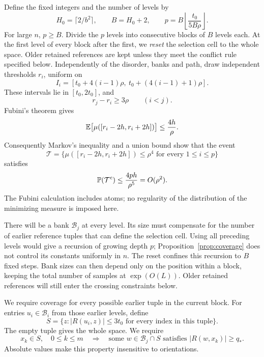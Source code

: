 Define the fixed integers and the number of levels by
\begin{equation}\label{eq:dyn-block-parameters}
 H_0=\lceil 2/b^2\rceil,\qquad B=H_0+2,\qquad
 p=B\left\lfloor\frac{t_0}{5B\rho}\right\rfloor.
\end{equation}
For large $n$, $p\ge B$. Divide the $p$ levels into consecutive blocks
of $B$ levels each. At the first level of every block after the first,
we \emph{reset} the selection cell to the whole space. Older retained
references are kept unless they meet the conflict rule specified below.
Independently of the disorder, banks and path, draw independent
thresholds $r_i$, uniform on
\begin{equation}\label{eq:dyn-threshold-intervals}
 I_i=[t_0+4(i-1)\rho,\ t_0+(4(i-1)+1)\rho].
\end{equation}
These intervals lie in $[t_0,2t_0]$, and
\begin{equation}\label{eq:dyn-threshold-separation}
 r_j-r_i\geq3\rho\qquad(i<j).
\end{equation}
Fubini's theorem gives
\[
 \mathbb E\big[\mu([r_i-2h,r_i+2h])\big]\leq\frac{4h}{\rho}.
\]
Consequently Markov's inequality and a union bound show that the event
\begin{equation}\label{eq:dyn-threshold-good}
 \mathcal T=\{\mu([r_i-2h,r_i+2h])\leq\rho^4
                   \text{ for every }1\leq i\leq p\}
\end{equation}
satisfies
\begin{equation}\label{eq:dyn-threshold-good-prob}
 \mathbb P(\mathcal T^c)\leq\frac{4ph}{\rho^5}=O(\rho^2).
\end{equation}
The Fubini calculation includes atoms; no regularity of the distribution
of the minimizing measure is imposed here.

There will be a bank $\mathcal B_j$ at every level. Its size must
compensate for the number of earlier reference tuples that can define
the selection cell. Using all preceding levels would give a recursion
of growing depth $p$; Proposition~\ref{prop:coverage} does not control
its constants uniformly in $n$. The reset confines this recursion to
$B$ fixed steps.
Bank sizes can then depend only on the position within a block, keeping
the total number of samples at $\exp(O(L))$. Older retained references
will still enter the crossing constraints below.

We require coverage for every possible earlier tuple in the current
block. For entries $u_i\in\mathcal B_i$ from those earlier levels, define
\begin{equation}\label{eq:dyn-cell}
 S=\{z:|R(u_i,z)|\leq3t_0
                    \text{ for every index in this tuple}\}.
\end{equation}
The empty tuple gives the whole space. We require
\begin{equation}\label{eq:dyn-bank-property}
 x_k\in S,\quad 0\leq k\leq m
 \quad\Longrightarrow\quad
 \text{some }w\in\mathcal B_j\cap S
          \text{ satisfies }|R(w,x_k)|\geq q_*.
\end{equation}
Absolute values make this property insensitive to orientations.

